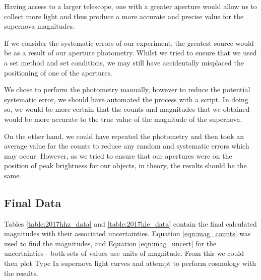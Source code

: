 \documentclass[twocolumn]{revtex4}
\begin{document}
Having access to a larger telescope, one with a greater aperture would allow us to collect more light and thus produce a more accurate and precise value for the supernova magnitudes.

If we consider the systematic errors of our experiment, the greatest source would be as a result of our aperture photometry. Whilst we tried to ensure that we used a set method and set conditions, we may still have accidentally misplaced the positioning of one of the apertures. 

We chose to perform the photometry manually, however to reduce the potential systematic error, we should have automated the process with a script. In doing so, we would be more certain that the counts and magnitudes that we obtained would be more accurate to the true value of the magnitude of the supernova.

On the other hand, we could have repeated the photometry and then took an average value for the counts to reduce any random and systematic errors which may occur. However, as we tried to ensure that our apertures were on the position of peak brightness for our objects, in theory, the results should be the same.

\vspace{-3ex}
\subsection{Final Data}
\vspace{-2ex}
Tables \ref{table:2017hhz_data} and \ref{table:2017hle_data} contain the final calculated magnitudes with their associated uncertainties. Equation \ref{eqn:mag_counts} was used to find the magnitudes, and Equation \ref{eqn:mag_uncert} for the uncertainties - both sets of values use units of magnitude. From this we could then plot Type Ia supernova light curves and attempt to perform cosmology with the results.
\end{document}
